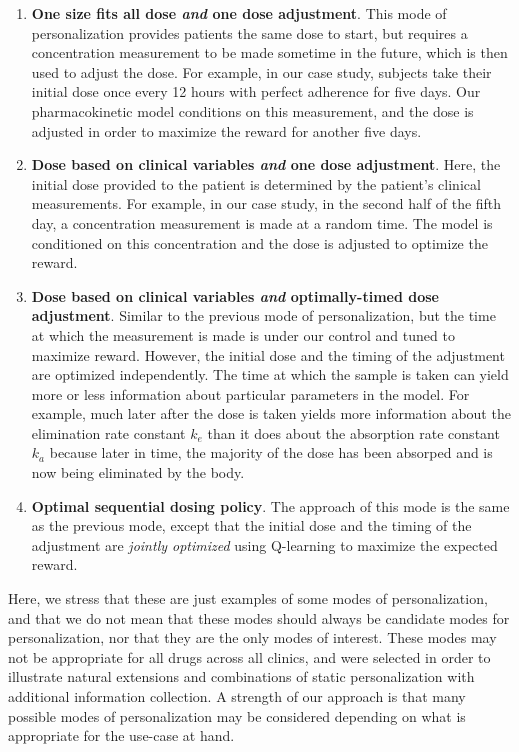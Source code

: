 \begin{enumerate}
	\item \textbf{One size fits all dose \textit{and} one dose adjustment}.  This mode of personalization provides patients the same dose to start, but requires a concentration measurement to be made sometime in the future, which is then used to adjust the dose.  For example, in our case study, subjects take their initial dose once every 12 hours with perfect adherence for five days.  Our pharmacokinetic model conditions on this measurement, and the dose is adjusted in order to maximize the reward for another five days.
	
	\item \textbf{Dose based on clinical variables \textit{and} one dose adjustment}.  Here, the initial dose provided to the patient is determined by the patient's clinical measurements. For example, in our case study, in the second half of the fifth day, a concentration measurement is made at a random time. The model is conditioned on this concentration and the dose is adjusted to optimize the reward.
	
	\item \textbf{Dose based on clinical variables \textit{and} optimally-timed dose adjustment}.  Similar to the previous mode of personalization, but the time at which the measurement is made is under our control and tuned to maximize reward. However, the initial dose and the timing of the adjustment are optimized independently. The time at which the sample is taken can yield more or less information about particular parameters in the model. For example, much later after the dose is taken yields more information about the elimination rate constant $k_e$ than it does about the absorption rate constant $k_a$ because later in time, the majority of the dose has been absorped and is now being eliminated by the body.
	
	\item \textbf{Optimal sequential dosing policy}. The approach of this mode is the same as the previous mode, except that the initial dose and the timing of the adjustment are \textit{jointly optimized} using Q-learning to maximize the expected reward.
\end{enumerate}

Here, we stress that these are just examples of some modes of personalization, and that we do not mean that these modes should always be candidate modes for personalization, nor that they are the only modes of interest.  These modes may not be appropriate for all drugs across all clinics, and were selected in order to illustrate natural extensions and combinations of static personalization with additional information collection. A strength of our approach is that many possible modes of personalization may be considered depending on what is appropriate for the use-case at hand.

